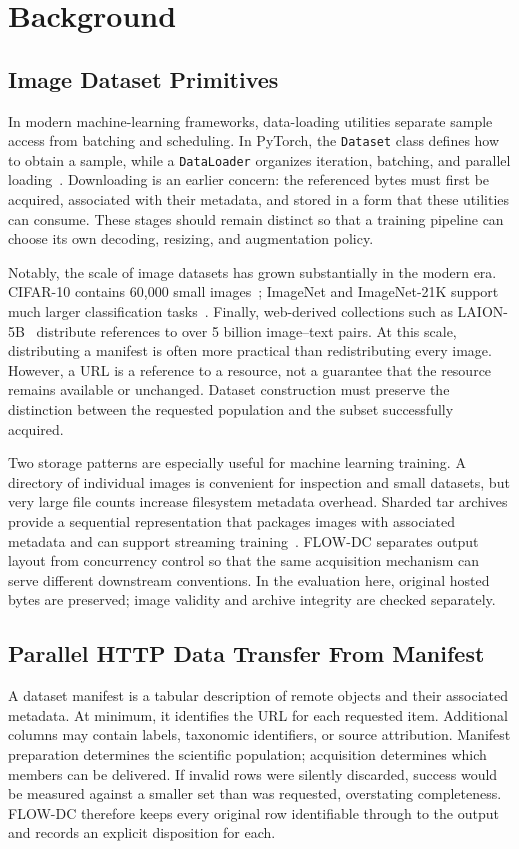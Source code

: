 \section{Background}\label{sec:background}
\subsection{Image Dataset Primitives}
In modern machine-learning frameworks, data-loading utilities separate sample access from batching and scheduling. In PyTorch, the \texttt{Dataset} class defines how to obtain a sample, while a \texttt{DataLoader} organizes iteration, batching, and parallel loading~\cite{pytorch}. Downloading is an earlier concern: the referenced bytes must first be acquired, associated with their metadata, and stored in a form that these utilities can consume. These stages should remain distinct so that a training pipeline can choose its own decoding, resizing, and augmentation policy.

Notably, the scale of image datasets has grown substantially in the modern era. CIFAR-10 contains 60,000 small images~\cite{cifar10}; ImageNet and ImageNet-21K support much larger classification tasks~\cite{imagenet,imagenet21k}. Finally, web-derived collections such as LAION-5B~\cite{laion5b} distribute references to over 5 billion image--text pairs. At this scale, distributing a manifest is often more practical than redistributing every image. However, a URL is a reference to a resource, not a guarantee that the resource remains available or unchanged. Dataset construction must preserve the distinction between the requested population and the subset successfully acquired.

Two storage patterns are especially useful for machine learning training. A directory of individual images is convenient for inspection and small datasets, but very large file counts increase filesystem metadata overhead. Sharded tar archives provide a sequential representation that packages images with associated metadata and can support streaming training~\cite{tar,webdataset}. FLOW-DC separates output layout from concurrency control so that the same acquisition mechanism can serve different downstream conventions. In the evaluation here, original hosted bytes are preserved; image validity and archive integrity are checked separately.

\subsection{Parallel HTTP Data Transfer From Manifest}
A dataset manifest is a tabular description of remote objects and their associated metadata. At minimum, it identifies the URL for each requested item. Additional columns may contain labels, taxonomic identifiers, or source attribution. Manifest preparation determines the scientific population; acquisition determines which members can be delivered. If invalid rows were silently discarded, success would be measured against a smaller set than was requested, overstating completeness. FLOW-DC therefore keeps every original row identifiable through to the output and records an explicit disposition for each.

